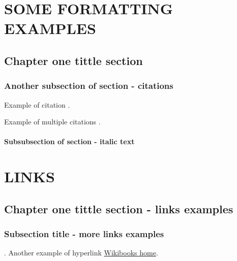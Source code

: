 \addchapheadtotoc
\chapter{SOME FORMATTING EXAMPLES}
\section{Chapter one tittle section}
\lipsum
\subsection{Another subsection of section - citations}
Example of citation \citep{altschul1997gapped}. \lipsum


Example of multiple citations \citep{altschul1997gapped,baker2007novel}.\lipsum
\subsubsection{Subsubsection of section - italic text}
\lipsum

\chapter{LINKS}
\section{Chapter one tittle section - links examples}
\lipsum
\subsection{Subsection title - more links examples}.
Another example of hyperlink \href{http://www.wikibooks.org}{Wikibooks home}.
